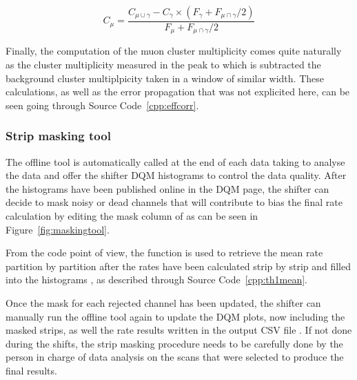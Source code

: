 	\begin{equation}
	\label{eq:muonCS}
	C_{\mu} = \frac{C_{\mu\cup\gamma} - C_{\gamma}\times(F_{\gamma}+F_{\mu\cap\gamma}/2)}{F_{\mu}+F_{\mu\cap\gamma}/2}
	\end{equation}
	
	Finally, the computation of the muon cluster multiplicity comes quite naturally as the cluster multiplicity measured in the peak to which is subtracted the background cluster multiplpicity taken in a window of similar width. These calculations, as well as the error propagation that was not explicited here, can be seen going through Source Code~\ref{cpp:effcorr}.
		
		\subsubsection{Strip masking tool}
		\label{app2:sssec:mask}
	
	The offline tool is automatically called at the end of each data taking to analyse the data and offer the shifter DQM histograms to control the data quality. After the histograms have been published online in the DQM page, the shifter can decide to mask noisy or dead channels that will contribute to bias the final rate calculation by editing the mask column of  as can be seen in Figure~\ref{fig:maskingtool}.
	
	From the code point of view, the function  is used to retrieve the mean rate partition by partition after the rates have been calculated strip by strip and filled into the histograms , as described through Source Code~\ref{cpp:th1mean}.
	
	Once the mask for each rejected channel has been updated, the shifter can manually run the offline tool again to update the DQM plots, now including the masked strips, as well the rate results written in the output CSV file . If not done during the shifts, the strip masking procedure needs to be carefully done by the person in charge of data analysis on the scans that were selected to produce the final results.
	
